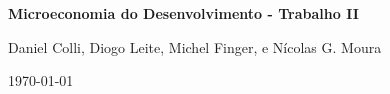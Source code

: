 \documentclass[12pt]{article}
\numberwithin{equation}{section}
\numberwithin{figure}{section}
\numberwithin{table}{section}
\numberwithin{theorem}{section}
\begin{document}
\thispagestyle{empty}

\begin{center}
    \large{\textbf{Microeconomia do Desenvolvimento - Trabalho II}}
\end{center}

\begin{center}
    \large{Daniel Colli, Diogo Leite, Michel Finger, e Nícolas G. Moura}
\end{center}

\begin{center}
    \large{\today}
\end{center}





\end{document}
